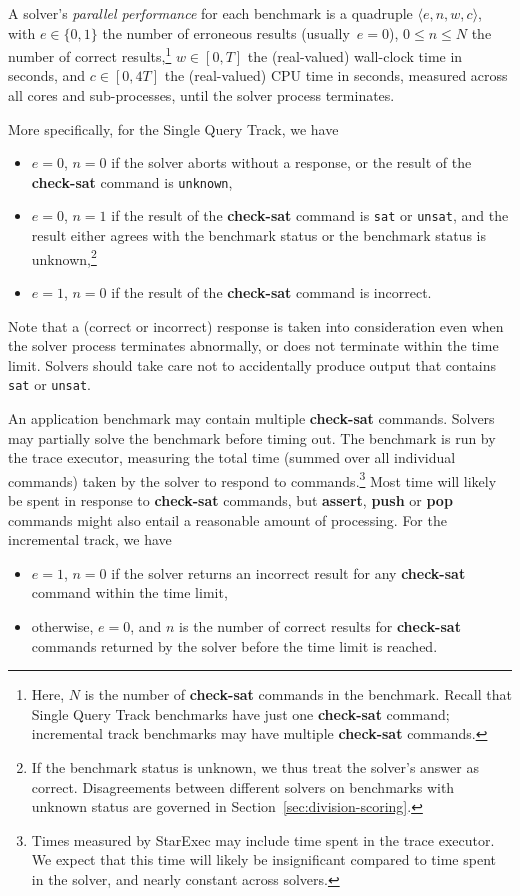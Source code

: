\documentclass[12pt]{article}
\newcommand{\akey}[1]{\textbf{#1}}
\newcommand{\main}{Single Query\xspace}
\begin{document}
A solver's \emph{parallel performance} for each benchmark is a quadruple $\langle
e, n, w, c\rangle$, with $e \in \{0, 1\}$ the number of erroneous
results (usually~$e = 0$), $0 \leq n \leq N$ the number of correct
results,\footnote{Here, $N$ is the number of \akey{check-sat} commands
  in the benchmark.  Recall that \main Track benchmarks have just one
  \akey{check-sat} command; incremental track benchmarks may have
  multiple \akey{check-sat} commands.} $w \in [0,T]$ the (real-valued)
wall-clock time in seconds, and $c \in [0, 4T]$ the (real-valued) CPU
time in seconds, measured across all cores and sub-processes, until
the solver process terminates.

\header{\main Track.} More specifically, for the \main Track, we have
%
\begin{itemize}
\item $e=0$, $n=0$ if the solver aborts without a response, or the
  result of the \akey{check-sat} command is \texttt{unknown},
\item $e=0$, $n=1$ if the result of the \akey{check-sat} command is
  \texttt{sat} or \texttt{unsat}, and the result either agrees with
  the benchmark status or the benchmark status is unknown,\footnote{If
    the benchmark status is unknown, we thus treat the solver's answer
    as correct.  Disagreements between different solvers on benchmarks
    with unknown status are governed in
    Section~\ref{sec:division-scoring}.}
\item $e=1$, $n=0$ if the result of the \akey{check-sat} command is
  incorrect.
\end{itemize}
%
Note that a (correct or incorrect) response is taken into
consideration even when the solver process terminates abnormally, or
does not terminate within the time limit.  Solvers should take care
not to accidentally produce output that contains \texttt{sat} or
\texttt{unsat}.

%
An application benchmark may contain multiple \akey{check-sat}
commands.  Solvers may partially solve the benchmark before timing
out.  The benchmark is run by the trace executor, measuring the total
time (summed over all individual commands) taken by the solver to
respond to commands.\footnote{Times measured by StarExec may include
  time spent in the trace executor.  We expect that this time will
  likely be insignificant compared to time spent in the solver, and
  nearly constant across solvers.}  Most time will likely be spent in
response to \akey{check-sat} commands, but \akey{assert}, \akey{push}
or \akey{pop} commands might also entail a reasonable amount of
processing.  For the incremental track, we have
\begin{itemize}
\item $e=1$, $n=0$ if the solver returns an incorrect result for any
  \akey{check-sat} command within the time limit,
\item otherwise, $e=0$, and $n$ is the number of correct results for
  \akey{check-sat} commands returned by the solver before the time
  limit is reached.
\end{itemize}
\end{document}

